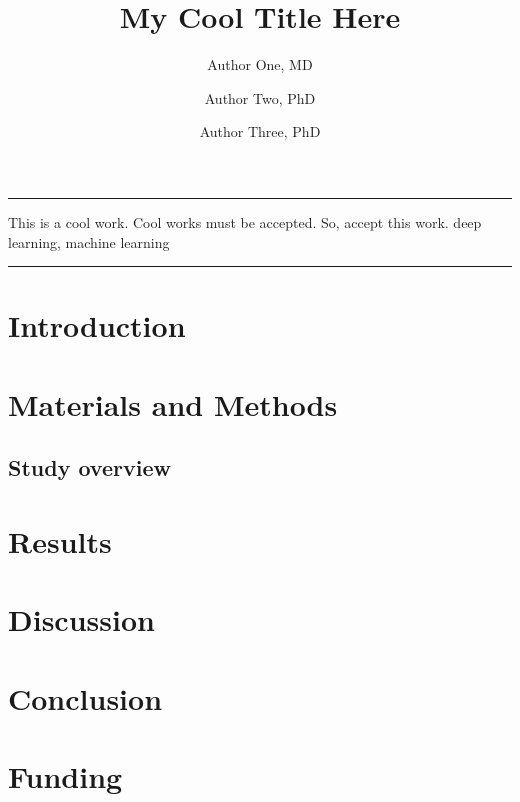 \documentclass[twocolumn, 8pt]{article}
\title{My Cool Title Here}
\author[1, 2]{Author One, MD}
\author[2]{Author Two, PhD}
\author[1]{Author Three, PhD}
\affil[1]{Institution One, Country;}
\affil[2]{Institution Two, Country}
\date{}
\begin{document}
\par\noindent\rule[-7pt]{15.5cm}{0.2em}
\begin{strip}
    \begin{minipage}{.88\textwidth}
        \maketitle
        \small
        \abstractSection
        {This is a cool work. Cool works must be accepted. So, accept this work.} %
        {} %
        {} %
        {} %
        {} %
        {deep learning, machine learning} %
        
        \par\noindent\rule[-7pt]{15.5cm}{0.2em}
        \hspace{2cm}
    \end{minipage}
\end{strip}


\section*{Introduction}
\lipsum[3-4] \cite{he2016deep}

\section*{Materials and Methods}
\subsection*{Study overview}
\lipsum[3-5]

\section*{Results}
\lipsum[3-4]

\section*{Discussion}
\lipsum[3-6]

\section*{Conclusion}
\lipsum[3-4]

\section*{Funding}
\lipsum[3-4]



\end{document}
